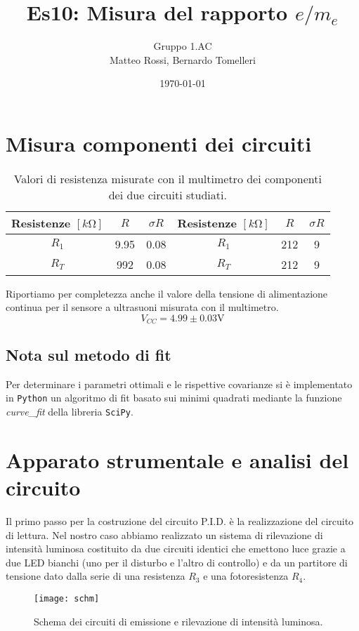 \documentclass[10pt, a4paper, italian]{article}
\author{Gruppo 1.AC \\ Matteo Rossi, Bernardo Tomelleri}
\title{Es10: Misura del rapporto $e/m_e$}
\begin{document}
\date{\today}
\maketitle

\setcounter{section}{0}

\section*{Misura componenti dei circuiti}
\begin{table}[htbp]
\centering
\begin{tabular}{ccc|ccc}
\toprule
Resistenze $[\si{k\ohm}]$ & $R$ & $\sigma R$ & Resistenze $[\si{k\ohm}]$ & $R$ &
$\sigma R$ \\
\midrule
\midrule
$R_1$	  	& 9.95 	& 0.08		& $R_1$ & 212	& 9 \\
$R_T$	  	& 992	& 0.08		& $R_T$ & 212	& 9 \\
\bottomrule
\end{tabular}
\caption{Valori di resistenza misurate con il multimetro dei componenti dei
due circuiti studiati. \label{tab: rcmes_B}}
\end{table}

Riportiamo per completezza anche il valore della tensione di alimentazione
continua per il sensore a ultrasuoni misurata con il multimetro.
\[
V_{CC} = 4.99 \pm 0.03 \si{\V}
\]

\subsection*{Nota sul metodo di fit}
Per determinare i parametri ottimali e le rispettive covarianze si \`e
implementato in \verb+Python+ un algoritmo di fit basato sui minimi quadrati
mediante la funzione \emph{curve\_fit} della libreria \texttt{SciPy}.

\section{Apparato strumentale e analisi del circuito}
Il primo passo per la costruzione del circuito P.I.D. è la realizzazione del
circuito di lettura. Nel nostro caso abbiamo realizzato un sistema di
rilevazione di intensità luminosa costituito da due circuiti identici che
emettono luce grazie a due LED bianchi (uno per il disturbo e l'altro di
controllo) e da un partitore di tensione dato dalla serie di una resistenza
$R_3$ e una fotoresistenza $R_4$.

\begin{figure}[htbp]
    \centering
	\texttt{[image: schm]}
    \caption{Schema dei circuiti di emissione e rilevazione di intensità
    luminosa.
    \label{schm: mesctrl}}
\end{figure}
\end{document}
